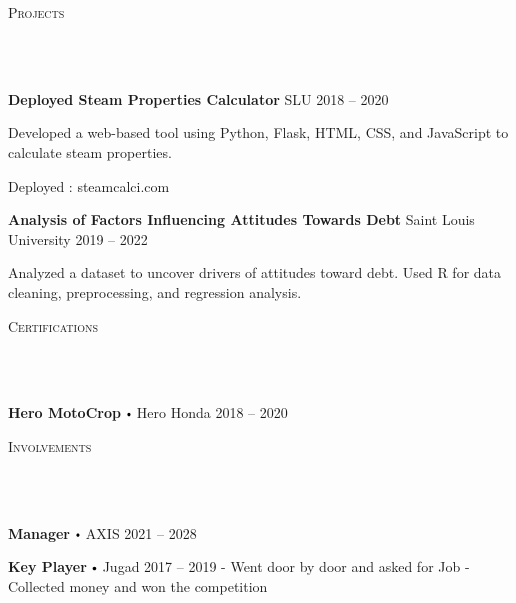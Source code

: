 \documentclass{article}
\newcommand{\project}[4]{{
          \vspace*{2pt}%
          \textbf{#1} #2 \hfill #3\\ #4 \vspace*{2pt}}
          }
\newcommand{\lineunder}{
        \vspace*{-8pt} \\ \hspace*{-18pt} 
        \hrulefill \\
        }
\newcommand{\header}[1]{{
        \hspace*{-15pt}\vspace*{6pt} \textsc{#1}} \vspace*{-6pt} 
        \lineunder
        }
\renewcommand{\labelitemi}{
        $\vcenter{\hbox{\tiny$\bullet$}}$\hspace*{3pt}
        }
\renewcommand{\labelitemii}{
        $\vcenter{\hbox{\tiny$\bullet$}}$\hspace*{-3pt}
        }
\newenvironment{bullet-list-major}{
          \begin{list}{\labelitemii}{\setlength\leftmargin{3pt} 
          \topsep 0pt \itemsep -2pt}}{\vspace*{4pt}\end{list}
          }
\newenvironment{bullet-list-minor}{
          \begin{list}{\labelitemii}{\setlength\leftmargin{15pt} 
            \topsep 0pt \itemsep -2pt}}{\vspace*{4pt}\end{list}
            }
\begin{document}
      \vspace*{4pt}%
      \header{Projects}
      {
      \project{Deployed Steam Properties Calculator}{SLU}{2018 -- 2020}{
          \begin{bullet-list-minor}
              \item Developed a web-based tool using Python, Flask, HTML, CSS, and JavaScript to calculate steam properties.
\item Deployed : steamcalci.com
          \end{bullet-list-minor}
      }
  

      \project{Analysis of Factors Influencing Attitudes Towards Debt}{Saint Louis University}{2019 -- 2022}{
          \begin{bullet-list-minor}
              \item Analyzed a dataset to uncover drivers of attitudes toward debt. Used R for data cleaning, preprocessing, and regression analysis.
          \end{bullet-list-minor}
      }
  }
  
      \vspace*{4pt}%
      \header{Certifications}
      {
        \begin{bullet-list-major}
        \item \textbf{Hero MotoCrop} \labelitemi Hero Honda \hfill 2018 -- 2020
        \end{bullet-list-major}
        }
      \vspace*{4pt}%
      \header{Involvements}
      {
            \begin{bullet-list-major}
            \item \textbf{Manager} \labelitemi AXIS \hfill 2021 -- 2028
            
            \end{bullet-list-major}
            

            \begin{bullet-list-major}
            \item \textbf{Key Player} \labelitemi Jugad \hfill 2017 -- 2019
            \newline -{ Went door by door and asked for Job
}\newline -{ Collected money and won the competition}
            \end{bullet-list-major}
            }
      
\end{document}
